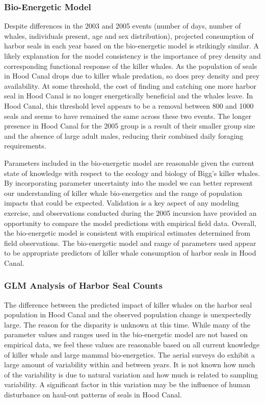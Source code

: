 \subsubsection{Bio-Energetic Model}\label{bio-energetic-model}

Despite differences in the 2003 and 2005 events (number of days, number
of whales, individuals present, age and sex distribution), projected
consumption of harbor seals in each year based on the bio-energetic
model is strikingly similar. A likely explanation for the model
consistency is the importance of prey density and corresponding
functional response of the killer whales. As the population of seals in
Hood Canal drops due to killer whale predation, so does prey density and
prey availability. At some threshold, the cost of finding and catching
one more harbor seal in Hood Canal is no longer energetically beneficial
and the whales leave. In Hood Canal, this threshold level appears to be
a removal between 800 and 1000 seals and seems to have remained the same
across these two events. The longer presence in Hood Canal for the 2005
group is a result of their smaller group size and the absence of large
adult males, reducing their combined daily foraging requirements.

Parameters included in the bio-energetic model are reasonable given the
current state of knowledge with respect to the ecology and biology of
Bigg's killer whales. By incorporating parameter uncertainty into the
model we can better represent our understanding of killer whale
bio-energetics and the range of population impacts that could be
expected. Validation is a key aspect of any modeling exercise, and
observations conducted during the 2005 incursion have provided an
opportunity to compare the model predictions with empirical field data.
Overall, the bio-energetic model is consistent with empirical estimates
determined from field observations. The bio-energetic model and range of
parameters used appear to be appropriate predictors of killer whale
consumption of harbor seals in Hood Canal.

\subsubsection{GLM Analysis of Harbor Seal
Counts}\label{glm-analysis-of-harbor-seal-counts}

The difference between the predicted impact of killer whales on the
harbor seal population in Hood Canal and the observed population change
is unexpectedly large. The reason for the disparity is unknown at this
time. While many of the parameter values and ranges used in the
bio-energetic model are not based on empirical data, we feel these
values are reasonable based on all current knowledge of killer whale and
large mammal bio-energetics. The aerial surveys do exhibit a large
amount of variability within and between years. It is not known how much
of the variability is due to natural variation and how much is related
to sampling variability. A significant factor in this variation may be
the influence of human disturbance on haul-out patterns of seals in Hood
Canal.

